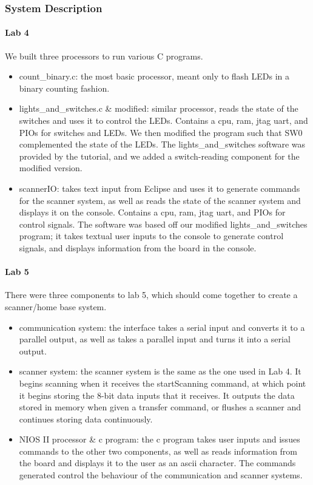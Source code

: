 \documentclass{article}
\begin{document}
    \subsubsection{System Description}
    \paragraph{Lab 4} We built three processors to run various C programs.
    \begin{itemize}
      \item count\_binary.c: the most basic processor, meant only to flash LEDs in a binary counting fashion.
      \item lights\_and\_switches.c \& modified: similar processor, reads the state of the switches and uses it to control the LEDs. Contains a cpu, ram, jtag uart, and PIOs for switches and LEDs. We then modified the program such that SW0 complemented the state of the LEDs. The lights\_and\_switches software was provided by the tutorial, and we added a switch-reading component for the modified version.
      \item scannerIO: takes text input from Eclipse and uses it to generate commands for the scanner system, as well as reads the state of the scanner system and displays it on the console. Contains a cpu, ram, jtag uart, and PIOs for control signals. The software was based off our modified lights\_and\_switches program; it takes textual user inputs to the console to generate control signals, and displays information from the board in the console.
    \end{itemize}

    \paragraph{Lab 5} There were three components to lab 5, which should come together to create a scanner/home base system.
    \begin{itemize}
      \item communication system: the interface takes a serial input and converts it to a parallel output, as well as takes a parallel input and turns it into a serial output.
      \item scanner system: the scanner system is the same as the one used in Lab 4. It begins scanning when it receives the startScanning command, at which point it begins storing the 8-bit data inputs that it receives. It outputs the data stored in memory when given a transfer command, or flushes a scanner and continues storing data continuously.
      \item NIOS II processor \& c program: the c program takes user inputs and issues commands to the other two components, as well as reads information from the board and displays it to the user as an ascii character. The commands generated control the behaviour of the communication and scanner systems.
    \end{itemize}
\end{document}

